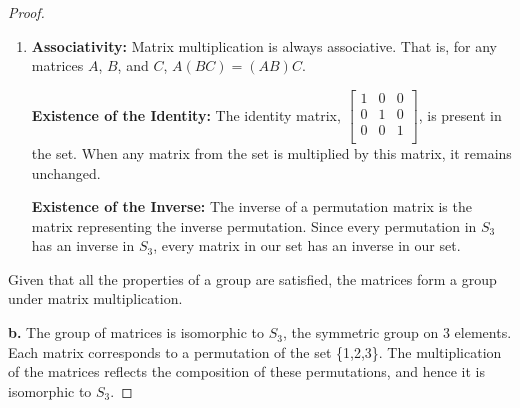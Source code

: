 \documentclass[12pt]{amsart}
\theoremstyle{definition}
\numberwithin{equation}{section}
\theoremstyle{plain}
\begin{document}
\begin{exercise}{21}
\begin{proof}
\begin{enumerate}
    \item \textbf{Associativity:} Matrix multiplication is always associative. That is, for any matrices \(A\), \(B\), and \(C\), \(A(BC) = (AB)C\).
    
    \textbf{Existence of the Identity:} The identity matrix, \( \begin{bmatrix} 1&0&0\\ 0&1&0\\ 0&0&1\\ \end{bmatrix} \), is present in the set. When any matrix from the set is multiplied by this matrix, it remains unchanged.
    
    \textbf{Existence of the Inverse:} The inverse of a permutation matrix is the matrix representing the inverse permutation. Since every permutation in \(S_3\) has an inverse in \(S_3\), every matrix in our set has an inverse in our set.
    
\end{enumerate}
Given that all the properties of a group are satisfied, the matrices form a group under matrix multiplication.

\textbf{b.} 
The group of matrices is isomorphic to \( S_3 \), the symmetric group on 3 elements. Each matrix corresponds to a permutation of the set \{1,2,3\}. The multiplication of the matrices reflects the composition of these permutations, and hence it is isomorphic to \( S_3 \).
\end{proof}
\end{exercise}
\vspace*{20pt}
\end{document}
